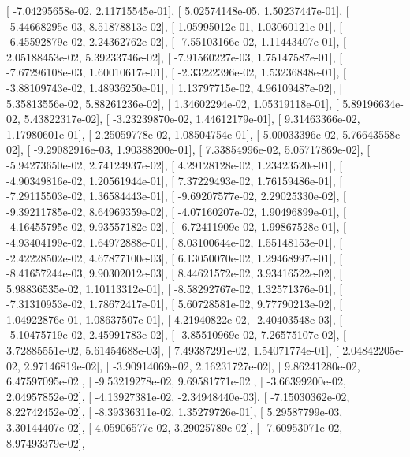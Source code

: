 \documentclass{article}
\begin{document}
       [ -7.04295658e-02,   2.11715545e-01],
       [  5.02574148e-05,   1.50237447e-01],
       [ -5.44668295e-03,   8.51878813e-02],
       [  1.05995012e-01,   1.03060121e-01],
       [ -6.45592879e-02,   2.24362762e-02],
       [ -7.55103166e-02,   1.11443407e-01],
       [  2.05188453e-02,   5.39233746e-02],
       [ -7.91560227e-03,   1.75147587e-01],
       [ -7.67296108e-03,   1.60010617e-01],
       [ -2.33222396e-02,   1.53236848e-01],
       [ -3.88109743e-02,   1.48936250e-01],
       [  1.13797715e-02,   4.96109487e-02],
       [  5.35813556e-02,   5.88261236e-02],
       [  1.34602294e-02,   1.05319118e-01],
       [  5.89196634e-02,   5.43822317e-02],
       [ -3.23239870e-02,   1.44612179e-01],
       [  9.31463366e-02,   1.17980601e-01],
       [  2.25059778e-02,   1.08504754e-01],
       [  5.00033396e-02,   5.76643558e-02],
       [ -9.29082916e-03,   1.90388200e-01],
       [  7.33854996e-02,   5.05717869e-02],
       [ -5.94273650e-02,   2.74124937e-02],
       [  4.29128128e-02,   1.23423520e-01],
       [ -4.90349816e-02,   1.20561944e-01],
       [  7.37229493e-02,   1.76159486e-01],
       [ -7.29115503e-02,   1.36584443e-01],
       [ -9.69207577e-02,   2.29025330e-02],
       [ -9.39211785e-02,   8.64969359e-02],
       [ -4.07160207e-02,   1.90496899e-01],
       [ -4.16455795e-02,   9.93557182e-02],
       [ -6.72411909e-02,   1.99867528e-01],
       [ -4.93404199e-02,   1.64972888e-01],
       [  8.03100644e-02,   1.55148153e-01],
       [ -2.42228502e-02,   4.67877100e-03],
       [  6.13050070e-02,   1.29468997e-01],
       [ -8.41657244e-03,   9.90302012e-03],
       [  8.44621572e-02,   3.93416522e-02],
       [  5.98836535e-02,   1.10113312e-01],
       [ -8.58292767e-02,   1.32571376e-01],
       [ -7.31310953e-02,   1.78672417e-01],
       [  5.60728581e-02,   9.77790213e-02],
       [  1.04922876e-01,   1.08637507e-01],
       [  4.21940822e-02,  -2.40403548e-03],
       [ -5.10475719e-02,   2.45991783e-02],
       [ -3.85510969e-02,   7.26575107e-02],
       [  3.72885551e-02,   5.61454688e-03],
       [  7.49387291e-02,   1.54071774e-01],
       [  2.04842205e-02,   2.97146819e-02],
       [ -3.90914069e-02,   2.16231727e-02],
       [  9.86241280e-02,   6.47597095e-02],
       [ -9.53219278e-02,   9.69581771e-02],
       [ -3.66399200e-02,   2.04957852e-02],
       [ -4.13927381e-02,  -2.34948440e-03],
       [ -7.15030362e-02,   8.22742452e-02],
       [ -8.39336311e-02,   1.35279726e-01],
       [  5.29587799e-03,   3.30144407e-02],
       [  4.05906577e-02,   3.29025789e-02],
       [ -7.60953071e-02,   8.97493379e-02],
\end{document}
